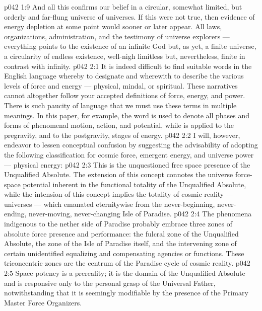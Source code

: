 \vs p042 1:9 \pc And all this confirms our belief in a circular, somewhat limited, but orderly and far\hyp{}flung universe of universes. If this were not true, then evidence of energy depletion at some point would sooner or later appear. All laws, organizations, administration, and the testimony of universe explorers --- everything points to the existence of an infinite God but, as yet, a finite universe, a circularity of endless existence, well\hyp{}nigh limitless but, nevertheless, finite in contrast with infinity.
\vs p042 2:1 It is indeed difficult to find suitable words in the English language whereby to designate and wherewith to describe the various levels of force and energy --- physical, mindal, or spiritual. These narratives cannot altogether follow your accepted definitions of force, energy, and power. There is such paucity of language that we must use these terms in multiple meanings. In this paper, for example, the word  is used to denote all phases and forms of phenomenal motion, action, and potential, while  is applied to the pregravity, and  to the postgravity, stages of energy.
\vs p042 2:2 I will, however, endeavor to lessen conceptual confusion by suggesting the advisability of adopting the following classification for cosmic force, emergent energy, and universe power --- physical energy:
\vs p042 2:3 \pc {}\bibnobreakspace {} This is the unquestioned free space presence of the Unqualified Absolute. The extension of this concept connotes the universe force\hyp{}space potential inherent in the functional totality of the Unqualified Absolute, while the intension of this concept implies the totality of cosmic reality --- universes --- which emanated eternitywise from the never\hyp{}beginning, never\hyp{}ending, never\hyp{}moving, never\hyp{}changing Isle of Paradise.
\vs p042 2:4 The phenomena indigenous to the nether side of Paradise probably embrace three zones of absolute force presence and performance: the fulcral zone of the Unqualified Absolute, the zone of the Isle of Paradise itself, and the intervening zone of certain unidentified equalizing and compensating agencies or functions. These triconcentric zones are the centrum of the Paradise cycle of cosmic reality.
\vs p042 2:5 Space potency is a prereality; it is the domain of the Unqualified Absolute and is responsive only to the personal grasp of the Universal Father, notwithstanding that it is seemingly modifiable by the presence of the Primary Master Force Organizers.
